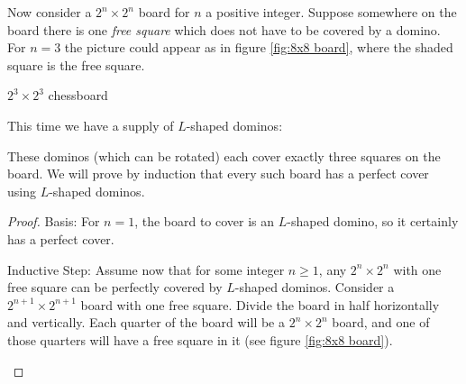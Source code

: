 \begin{exmp} Now consider a $2^n\times 2^n$ board for $n$ a positive integer.
Suppose somewhere on the board there is one {\itshape free square} which does not have to
be covered by a domino. For $n=3$ the picture could appear as in figure \ref{fig:8x8 board},
where the shaded square is the free square.
 \begin{marginfigure}
  \caption{$2^3\times 2^3$ chessboard}\label{fig:8x8 board}
 \end{marginfigure}


This time we have a supply of $L$-shaped dominos:
These dominos (which can be rotated) each cover exactly three squares on the board.
We will prove by induction that every such board has a perfect cover using
$L$-shaped dominos.
\begin{proof}
 \textsf{Basis:} For $n=1$, the board to cover is an $L$-shaped domino, so
 it certainly has a perfect cover.
 
 \textsf{Inductive Step:} Assume now that for some integer $n\geq 1$, 
 any $2^n\times 2^n$ with one free square can be perfectly covered by
 $L$-shaped dominos. Consider a $2^{n+1}\times 2^{n+1}$ board with one free square.
 Divide the board in half horizontally and vertically. Each quarter of the
 board will be a  $2^n\times 2^n$ board, and one of those quarters
 will have a free square in it (see figure \ref{fig:8x8 board}).
 \begin{marginfigure}
\end{marginfigure}
\end{proof}
\end{exmp}
